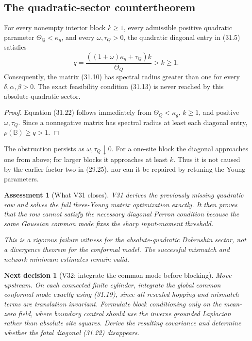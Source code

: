 \documentclass[11pt]{article}
\newtheorem{decision}[theorem]{Next decision}
\newtheorem{assessment}[theorem]{Assessment}
\theoremstyle{remark}
\begin{document}
\subsection{The quadratic-sector countertheorem}

\begin{countertheorem}
\label{ctr:v17v31-qobstruction}
For every nonempty interior block \(k\geq1\), every admissible positive quadratic
parameter \(\Theta_Q<\kappa_g\), and every
\(\omega,\tau_Q>0\), the quadratic diagonal entry in (31.5) satisfies
\[
 \boxed{
 q=\frac{((1+\omega)\kappa_g+\tau_Q)k}{\Theta_Q}>k\geq1.}       \tag{31.22}
\]
Consequently, the matrix (31.10) has spectral radius greater than one
for every \(\delta,\alpha,\beta>0\).  The exact feasibility condition
(31.13) is never reached by this absolute-quadratic sector.
\end{countertheorem}

\begin{proof}
Equation (31.22) follows immediately from
\(\Theta_Q<\kappa_g\), \(k\geq1\), and positive
\(\omega,\tau_Q\).  Since a nonnegative matrix has spectral radius at
least each diagonal entry, \(\rho(\mathbb B)\geq q>1\).
\end{proof}

The obstruction persists as \(\omega,\tau_Q\downarrow0\).  For a
one-site block the diagonal approaches one from above; for larger
blocks it approaches at least \(k\).  Thus it is not caused by the
earlier factor two in (29.25), nor can it be repaired by retuning the
Young parameters.

\begin{assessment}[What V31 closes]
\label{ass:v17v31-status}
V31 derives the previously missing quadratic row and solves the full
three-Young matrix optimization exactly.  It then proves that the row
cannot satisfy the necessary diagonal Perron condition because the
same Gaussian common mode fixes the sharp input-moment threshold.

This is a rigorous failure witness for the absolute-quadratic
Dobrushin sector, not a divergence theorem for the conformal model.
The successful mismatch and network-minimum estimates remain valid.
\end{assessment}

\begin{decision}[V32: integrate the common mode before blocking]
\label{dec:v17v31-next}
Move upstream.  On each connected finite cylinder, integrate the global
common conformal mode exactly using (31.19), since all rescaled hopping
and mismatch terms are translation invariant.  Formulate block
conditioning only on the mean-zero field, where boundary control should
use the inverse grounded Laplacian rather than absolute site squares.
Derive the resulting covariance and determine whether the fatal
diagonal (31.22) disappears.
\end{decision}
\end{document}
